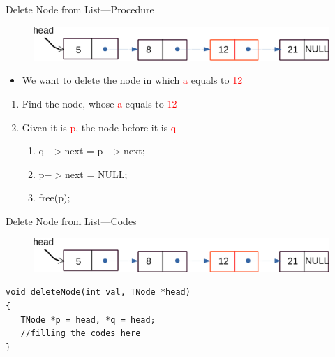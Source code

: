 \begin{frame}[fragile]{Delete Node from List---Procedure}
\vspace{0.2in}
\begin{figure}
\begin{center}
	\includegraphics[width=0.6\linewidth]{figs/list_delete_step1.pdf}
\end{center}
\end{figure}
\begin{itemize}
	\item {We want to delete the node in which \textcolor{red}{a} equals to \textcolor{red}{12}}
\end{itemize}
\begin{enumerate}
	\item {Find the node, whose \textcolor{red}{a} equals to \textcolor{red}{12}}
	\item {Given it is \textcolor{red}{p}, the node before it is \textcolor{red}{q}}
	\begin{enumerate}
		\item {\mbox{q$->$next} = \mbox{p$->$next};}
		\item {p$->$next = NULL;}
		\item {free(p);}
	\end{enumerate}
\end{enumerate}

\end{frame}


\begin{frame}[fragile]{Delete Node from List---Codes}
\vspace{-0.1in}
\begin{figure}
\begin{center}
	\includegraphics[width=0.6\linewidth]{figs/list_delete_step1.pdf}
\end{center}
\end{figure}
\begin{lstlisting}[xleftmargin=0.05\linewidth, linewidth=0.9\linewidth]
void deleteNode(int val, TNode *head)
{
   TNode *p = head, *q = head;
   //filling the codes here
}
\end{lstlisting}
\end{frame}

